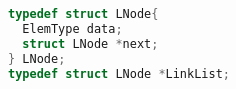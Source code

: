\begin{lstlisting}[language=C]
typedef struct LNode{
  ElemType data;
  struct LNode *next;
} LNode;
typedef struct LNode *LinkList;
\end{lstlisting}
